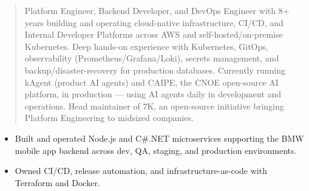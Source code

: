 \documentclass[10pt,a4paper]{altacv}
\begin{document}


\begin{fullwidth}
\makecvheader
\end{fullwidth}

\begin{quote}
Platform Engineer, Backend Developer, and DevOps Engineer with 8+ years building and operating cloud-native infrastructure, CI/CD, and Internal Developer Platforms across AWS and self-hosted/on-premise Kubernetes. Deep hands-on experience with Kubernetes, GitOps, observability (Prometheus/Grafana/Loki), secrets management, and backup/disaster-recovery for production databases. Currently running kAgent (product AI agents) and CAIPE, the CNOE open-source AI platform, in production --- using AI agents daily in development and operations. Head maintainer of 7K, an open-source initiative bringing Platform Engineering to midsized companies.
\end{quote}





\begin{itemize}
\item Built and operated Node.js and C\#.NET microservices supporting the BMW mobile app backend across dev, QA, staging, and production environments.
\item Owned CI/CD, release automation, and infrastructure-as-code with Terraform and Docker.
\end{itemize}
\divider
\end{document}
